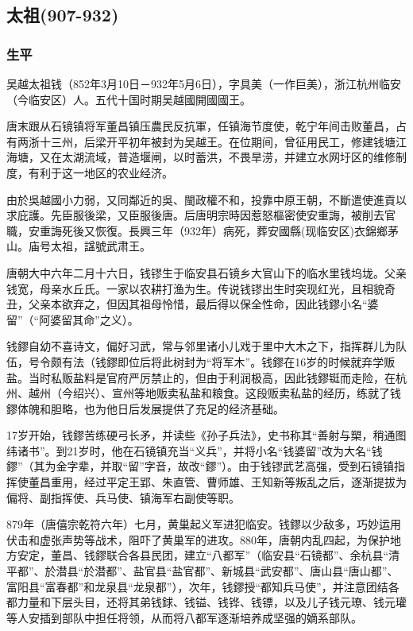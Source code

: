 
\subsection{太祖\tiny(907-932)}

\subsubsection{生平}

吴越太祖钱（852年3月10日－932年5月6日），字具美（一作巨美），浙江杭州临安（今临安区）人。五代十国时期吴越國開國國王。

唐末跟从石镜镇将军董昌镇压農民反抗軍，任镇海节度使，乾宁年间击败董昌，占有两浙十三州，后梁开平初年被封为吴越王。在位期间，曾征用民工，修建钱塘江海塘，又在太湖流域，普造堰闸，以时蓄洪，不畏旱涝，并建立水网圩区的维修制度，有利于这一地区的农业经济。

由於吳越國小力弱，又同鄰近的吳、閩政權不和，投靠中原王朝，不斷遣使進貢以求庇護。先臣服後梁，又臣服後唐。后唐明宗時因惹怒樞密使安重誨，被削去官職，安重誨死後又恢復。長興三年（932年）病死，葬安國縣(现临安区)衣錦鄉茅山。庙号太祖，諡號武肃王。

唐朝大中六年二月十六日，钱镠生于临安县石镜乡大官山下的临水里钱坞垅。父亲钱宽，母亲水丘氏。一家以农耕打渔为生。传说钱镠出生时突现红光，且相貌奇丑，父亲本欲弃之，但因其祖母怜惜，最后得以保全性命，因此钱鏐小名“婆留”（“阿婆留其命”之义）。

钱鏐自幼不喜诗文，偏好习武，常与邻里诸小儿戏于里中大木之下，指挥群儿为队伍，号令颇有法（钱鏐即位后将此树封为“将军木”。钱鏐在16岁的时候就弃学贩盐。当时私贩盐料是官府严厉禁止的，但由于利润极高，因此钱鏐铤而走险，在杭州、越州（今绍兴）、宣州等地贩卖私盐和粮食。这段贩卖私盐的经历，练就了钱鏐体魄和胆略，也为他日后发展提供了充足的经济基础。

17岁开始，钱鏐苦练硬弓长矛，并读些《孙子兵法》，史书称其“善射与槊，稍通图纬诸书”。到21岁时，他在石镜镇充当“义兵”，并将小名“钱婆留”改为大名“钱鏐”（其为金字辈，并取“留”字音，故改“鏐”）。由于钱镠武艺高强，受到石镜镇指挥使董昌重用，经过平定王郢、朱直管、曹师雄、王知新等叛乱之后，逐渐提拔为偏将、副指挥使、兵马使、镇海军右副使等职。

879年（唐僖宗乾符六年）七月，黄巢起义军进犯临安。钱鏐以少敌多，巧妙运用伏击和虚张声势等战术，阻吓了黄巢军的进攻。880年，唐朝内乱四起，为保护地方安定，董昌、钱鏐联合各县民团，建立“八都军”（临安县“石镜都”、余杭县“清平都”、於潜县“於潜都”、盐官县“盐官都”、新城县“武安都”、唐山县“唐山都”、富阳县“富春都”和龙泉县“龙泉都”），次年，钱鏐授“都知兵马使”，并注意团结各都力量和下层头目，还将其弟钱銶、钱镒、钱铧、钱镖，以及儿子钱元璙、钱元瓘等人安插到部队中担任将领，从而将八都军逐渐培养成坚强的嫡系部队。

